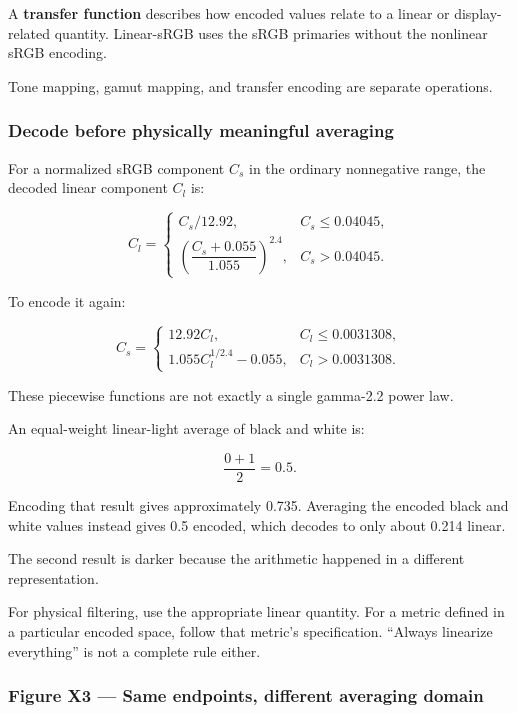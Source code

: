 A \textbf{transfer function} describes how encoded values relate to a linear or display-related quantity. Linear-sRGB uses the sRGB primaries without the nonlinear sRGB encoding.

Tone mapping, gamut mapping, and transfer encoding are separate operations.

\subsubsection{Decode before physically meaningful averaging}\label{04-visual-computing-ii-ch042-decode-before-physically-meaningful-averaging}

\hypertarget{04-visual-computing-ii-ch042-decode-before-physically-meaningful-averaging}{}

For a normalized sRGB component \(C_s\) in the ordinary nonnegative range, the decoded linear component \(C_l\) is:

\[
C_l=
\begin{cases}
C_s/12.92,&C_s\leq0.04045,\\
\left(\dfrac{C_s+0.055}{1.055}\right)^{2.4},
&C_s>0.04045.
\end{cases}
\]

To encode it again:

\[
C_s=
\begin{cases}
12.92C_l,&C_l\leq0.0031308,\\
1.055C_l^{1/2.4}-0.055,&C_l>0.0031308.
\end{cases}
\]

These piecewise functions are not exactly a single gamma-2.2 power law.

An equal-weight linear-light average of black and white is:

\[
\frac{0+1}{2}=0.5.
\]

Encoding that result gives approximately 0.735. Averaging the encoded black and white values instead gives 0.5 encoded, which decodes to only about 0.214 linear.

The second result is darker because the arithmetic happened in a different representation.

For physical filtering, use the appropriate linear quantity. For a metric defined in a particular encoded space, follow that metric's specification. ``Always linearize everything'' is not a complete rule either.

\subsubsection{Figure X3 --- Same endpoints, different averaging domain}\label{04-visual-computing-ii-ch042-figure-x3-same-endpoints-different-averaging-domain}

